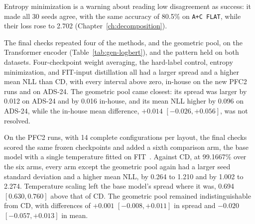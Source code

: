 Entropy minimization is a warning about reading low disagreement as
success: it made all 30 seeds agree, with the same accuracy of 80.5\%
on \texttt{A+C FLAT}, while their loss rose to 2.702
(Chapter~\ref{ch:decomposition}).

The final checks repeated four of the methods, and the geometric pool,
on the Transformer encoder (Table~\ref{tab:gen-logbert}), and the
pattern held on both datasets. Four-checkpoint weight averaging, the hard-label control,
entropy minimization, and FIT-input distillation all had a larger
spread and a higher mean NLL than CD, with every interval above zero,
in-house on the new PFC2 runs and on ADS-24. The geometric pool came
closest: its spread was larger by 0.012 on ADS-24 and by 0.016
in-house, and its mean NLL higher by 0.096 on ADS-24, while the
in-house mean difference, $+0.014$ $[-0.026, +0.056]$, was not
resolved.


On the PFC2 runs, with 14 complete configurations per layout, the
final checks scored the same frozen checkpoints and added a sixth
comparison arm, the base model with a single temperature fitted on
FIT~\cite{guo2017calibration}. Against CD, at 99.1667\% over the six
arms, every arm except the geometric pool again had a larger seed
standard deviation and a higher mean NLL, by 0.264 to 1.210 and by
1.002 to 2.274. Temperature scaling left the base model's spread where
it was, 0.694 $[0.630, 0.760]$ above that of CD. The geometric pool
remained indistinguishable from CD, with differences of $+0.001$
$[-0.008, +0.011]$ in spread and $-0.020$ $[-0.057, +0.013]$ in mean.

